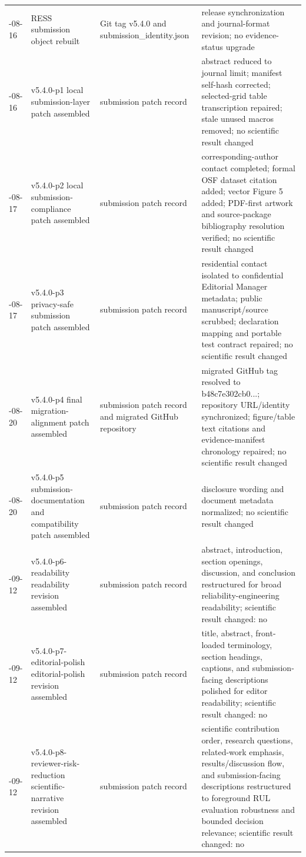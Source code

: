 \begin{longtable}{@{}>{\raggedright\arraybackslash}p{}>{\raggedright\arraybackslash}p{}>{\raggedright\arraybackslash}p{}>{\raggedright\arraybackslash}p{}@{}}
2026-08-16 & RESS submission object rebuilt & Git tag v5.4.0 and submission\_identity.json & release synchronization and journal-format revision; no evidence-status upgrade \\
2026-08-16 & v5.4.0-p1 local submission-layer patch assembled & submission patch record & abstract reduced to journal limit; manifest self-hash corrected; selected-grid table transcription repaired; stale unused macros removed; no scientific result changed \\
2026-08-17 & v5.4.0-p2 local submission-compliance patch assembled & submission patch record & corresponding-author contact completed; formal OSF dataset citation added; vector Figure 5 added; PDF-first artwork and source-package bibliography resolution verified; no scientific result changed \\
2026-08-17 & v5.4.0-p3 privacy-safe submission patch assembled & submission patch record & residential contact isolated to confidential Editorial Manager metadata; public manuscript/source scrubbed; declaration mapping and portable test contract repaired; no scientific result changed \\
2026-08-20 & v5.4.0-p4 final migration-alignment patch assembled & submission patch record and migrated GitHub repository & migrated GitHub tag resolved to b48c7e302cb0...; repository URL/identity synchronized; figure/table text citations and evidence-manifest chronology repaired; no scientific result changed \\
2026-08-20 & v5.4.0-p5 submission-documentation and compatibility patch assembled & submission patch record & disclosure wording and document metadata normalized; no scientific result changed \\
2026-09-12 & v5.4.0-p6-readability readability revision assembled & submission patch record & abstract, introduction, section openings, discussion, and conclusion restructured for broad reliability-engineering readability; scientific result changed: no \\
2026-09-12 & v5.4.0-p7-editorial-polish editorial-polish revision assembled & submission patch record & title, abstract, front-loaded terminology, section headings, captions, and submission-facing descriptions polished for editor readability; scientific result changed: no \\
2026-09-12 & v5.4.0-p8-reviewer-risk-reduction scientific-narrative revision assembled & submission patch record & scientific contribution order, research questions, related-work emphasis, results/discussion flow, and submission-facing descriptions restructured to foreground RUL evaluation robustness and bounded decision relevance; scientific result changed: no \\

\end{longtable}
